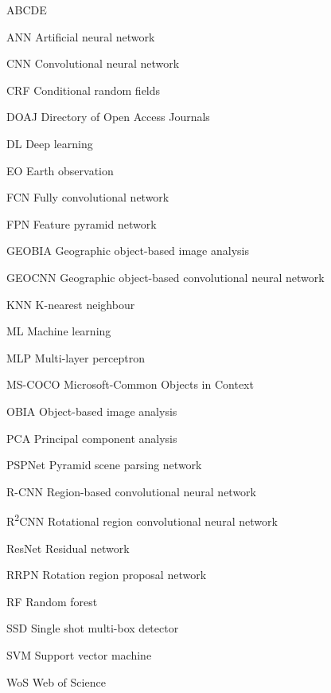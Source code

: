 
\begin{seznamzkratek}{ABCDE}

	      {ANN}
	      {Artificial neural network}

	      {CNN}
	      {Convolutional neural network}

	      {CRF}
	      {Conditional random fields}

	      {DOAJ}
	      {Directory of Open Access Journals}

	      {DL}
	      {Deep learning}

	      {EO}
	      {Earth observation}

	      {FCN}
	      {Fully convolutional network}

	      {FPN}
	      {Feature pyramid network}

	      {GEOBIA}
	      {Geographic object-based image analysis}

	      {GEOCNN}
	      {Geographic object-based convolutional neural network}

	      {KNN}
	      {K-nearest neighbour}

	      {ML}
	      {Machine learning}

	      {MLP}
	      {Multi-layer perceptron}

	      {MS-COCO}
	      {Microsoft-Common Objects in Context}

	      {OBIA}
	      {Object-based image analysis}

	      {PCA}
	      {Principal component analysis}

	      {PSPNet}
	      {Pyramid scene parsing network}

	      {R-CNN}
	      {Region-based convolutional neural network}

	      {R\textsuperscript{2}CNN}
	      {Rotational region convolutional neural network}

	      {ResNet}
	      {Residual network}

	      {RRPN}
	      {Rotation region proposal network}

	      {RF}
	      {Random forest}

	      {SSD}
	      {Single shot multi-box detector}

	      {SVM}
	      {Support vector machine}

	      {WoS}
	      {Web of Science}
	      
\end{seznamzkratek}
